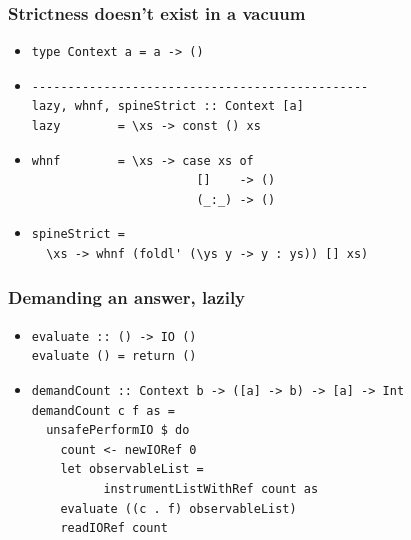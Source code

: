 \documentclass{beamer}
\begin{document}
\begin{frame}[fragile]
\frametitle{Strictness doesn't exist in a vacuum}

\begin{itemize}
\setlength\itemsep{-0.5em}
\item<1->[]
\begin{verbatim}
type Context a = a -> ()
\end{verbatim}
\item<2->[]
\begin{verbatim}
-----------------------------------------------
lazy, whnf, spineStrict :: Context [a]
lazy        = \xs -> const () xs
\end{verbatim}
\item<3->[]
\begin{verbatim}
whnf        = \xs -> case xs of
                       []    -> ()
                       (_:_) -> ()
\end{verbatim}
\item<4->[]
\begin{verbatim}
spineStrict =
  \xs -> whnf (foldl' (\ys y -> y : ys)) [] xs)
\end{verbatim}
\end{itemize}
\end{frame}


\begin{frame}[fragile]
\frametitle{Demanding an answer, lazily}
\begin{itemize}
\item<1->[]
\begin{verbatim}
evaluate :: () -> IO ()
evaluate () = return ()
\end{verbatim}
\item<2->[]
\begin{verbatim}
demandCount :: Context b -> ([a] -> b) -> [a] -> Int
demandCount c f as =
  unsafePerformIO $ do
    count <- newIORef 0
    let observableList =
          instrumentListWithRef count as
    evaluate ((c . f) observableList)
    readIORef count
\end{verbatim}
\end{itemize}
\end{frame}
\end{document}

